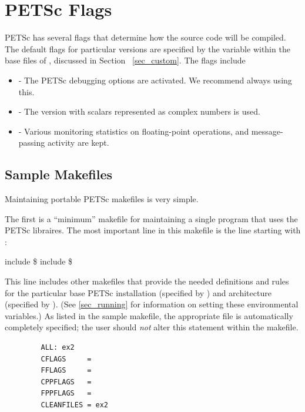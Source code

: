 {{{\section{PETSc Flags}
\label{sec_makeflags}

PETSc has several flags that determine how the source code will be
compiled.  The default flags for particular versions are specified by
the variable  within the base files of , discussed in Section
~\ref{sec_custom}.  The flags include
\begin{itemize}
\item {} - The PETSc debugging options are activated. We
      recommend always using this. 
\item {} - The version with scalars represented
      as complex numbers is used. 
\item {} - Various monitoring statistics on floating-point operations,
      and message-passing activity are kept. 
\end{itemize}

\subsection{Sample Makefiles}

Maintaining portable PETSc makefiles is very simple.

The first is a ``minimum'' makefile for maintaining
a single program that uses the PETSc libraires.
The most important line in this makefile is the line starting with :
\begin{tabbing}
   include  \$
   include \$
\end{tabbing}
This line includes other makefiles that provide the needed definitions
and rules for the particular base PETSc installation (specified by
) and architecture (specified by
).  (See \ref{sec_running} for information on
setting these environmental variables.)  As listed in the sample
makefile, the appropriate  file is automatically
completely specified; the user should {\em not} alter this statement
within the makefile.

\begin{figure}[H]
{\small
\begin{verbatim}
   ALL: ex2
   CFLAGS     =
   FFLAGS     =
   CPPFLAGS   =
   FPPFLAGS   =
   CLEANFILES = ex2


\end{verbatim}}
\end{figure}}}}
